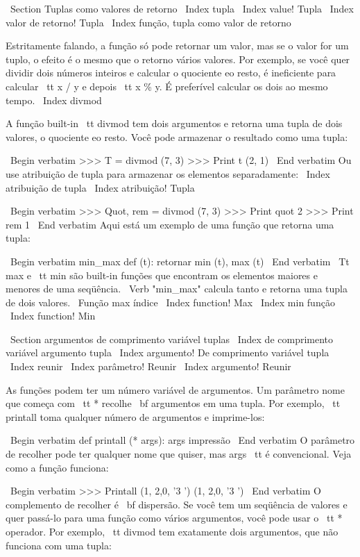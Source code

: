 \documentclass[10pt]{book}
\begin{document}
{{{{{{{{\ Section {Tuplas como valores de retorno}
\ Index {} tupla
\ Index {value! Tupla}
\ Index {valor de retorno! Tupla}
\ Index {função, tupla como valor de retorno}

Estritamente falando, a função só pode retornar um valor, mas
se o valor for um tuplo, o efeito é o mesmo que o retorno
vários valores. Por exemplo, se você quer dividir dois números inteiros
e calcular o quociente eo resto, é ineficiente para
calcular {\ tt x / y} e depois {\ tt x \% y}. É preferível calcular
os dois ao mesmo tempo.
\ Index {} divmod

A função built-in {\ tt divmod} tem dois argumentos e
retorna uma tupla de dois valores, o quociente eo resto.
Você pode armazenar o resultado como uma tupla:

\ Begin {verbatim}
>>> T = divmod (7, 3)
>>> Print t
(2, 1)
\ End {verbatim}
%
Ou use atribuição de tupla para armazenar os elementos separadamente:
\ Index {atribuição de tupla}
\ Index {atribuição! Tupla}

\ Begin {verbatim}
>>> Quot, rem = divmod (7, 3)
>>> Print quot
2
>>> Print rem
1
\ End {verbatim}
%
Aqui está um exemplo de uma função que retorna uma tupla:

\ Begin {verbatim}
min_max def (t):
    retornar min (t), max (t)
\ End {verbatim}
%
{\ Tt max} e {\ tt min} são built-in funções que encontram
os elementos maiores e menores de uma seqüência. \ Verb "min_max"
calcula tanto e retorna uma tupla de dois valores.
\ {Função max} índice
\ Index {function! Max}
\ Index {min função}
\ Index {function! Min}


\ Section {argumentos de comprimento variável tuplas}
\ Index {de comprimento variável argumento tupla}
\ Index {argumento! De comprimento variável tupla}
\ Index {reunir}
\ Index {parâmetro! Reunir}
\ Index {argumento! Reunir}

As funções podem ter um número variável de argumentos. Um parâmetro
nome que começa com {\ tt *} {recolhe \ bf} argumentos em
uma tupla. Por exemplo, {\ tt printall}
toma qualquer número de argumentos e imprime-los:

\ Begin {verbatim}
def printall (* args):
    args impressão
\ End {verbatim}
%
O parâmetro de recolher pode ter qualquer nome que quiser, mas {args \ tt} é
convencional. Veja como a função funciona:

\ Begin {verbatim}
>>> Printall (1, 2,0, '3 ')
(1, 2,0, '3 ')
\ End {verbatim}
%
O complemento de recolher é {\ bf dispersão}. Se você tem um
seqüência de valores e quer passá-lo para uma função
como vários argumentos, você pode usar o {\ tt *} operador.
Por exemplo, {\ tt divmod} tem exatamente dois argumentos, que
não funciona com uma tupla:

}}}}}}}}
\end{document}
